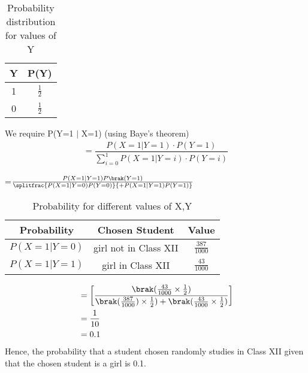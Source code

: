 \documentclass[journal,12pt,two column]{IEEEtran}
\begin{document}
\begin{table}[ht]
\caption{Probability distribution for values of Y}
\begin{center}
    \begin{tabular}{|c|c|}
    \hline
    Y & P(Y)\\
    \hline
    1 & $\frac{1}{2}$ \\
    \hline
    0 & $\frac{1}{2}$\\
    \hline
    \end{tabular}
\end{center} 
\end{table}
We require P(Y=1 $\vert$ X=1) (using Baye's theorem)
\begin{align}
=\dfrac{P(X=1\vert Y=1)\cdot P(Y=1)}{\sum_{i=0}^{1} P(X=1\vert Y=i)\cdot P(Y=i)}
\end{align}
\begin{center} 
=$\frac{P(X=1 \vert Y=1)P\brak(Y=1)}{\splitfrac{P(X=1\vert Y=0)P(Y=0)}{+P(X=1\vert Y=1)P(Y=1)}}$
\end{center}
\begin{table}[ht]
\caption{Probability for different values of X,Y}
\begin{center}
    \begin{tabular}{|c|c|c|}
    \hline
    Probability & Chosen Student & Value\\
    \hline
    $P(X=1\vert Y=0)$ & girl not in Class XII & $\frac{387}{1000}$\\
    \hline
    $ P(X=1\vert Y=1)$ & girl in Class XII & $\frac{43}{1000}$ \\
    \hline
    \end{tabular}
\end{center}    
\end{table} 
\begin{align}
&=\left[\dfrac{\brak( \frac{43}{1000}\times \frac{1}{2})}{\brak( \frac{387}{1000})\times \frac{1}{2}) + \brak( \frac{43}{1000}\times \frac{1}{2})}\right]\\
&=\dfrac{1}{10}\\ 
&=0.1
\end{align}
Hence, the probability that a student chosen randomly studies in Class XII given that the chosen student is a girl is 0.1.
\end{document}
